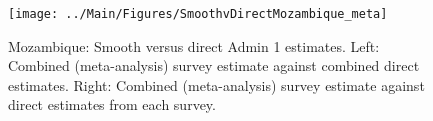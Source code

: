 \documentclass[12pt]{article}\usepackage[]{graphicx}\usepackage[]{color}
\newenvironment{knitrout}{}{} %
\begin{document}

\begin{knitrout}
\color{fgcolor}\begin{figure}[bht]

{\centering \texttt{[image: ../Main/Figures/SmoothvDirectMozambique\_meta]} 

}

\caption[Mozambique]{Mozambique: Smooth versus direct Admin 1 estimates. Left: Combined (meta-analysis) survey estimate against combined direct estimates. Right: Combined (meta-analysis) survey estimate against direct estimates from each survey.}\label{fig:unnamed-chunk-233}
\end{figure}


\end{knitrout}
\end{document}
